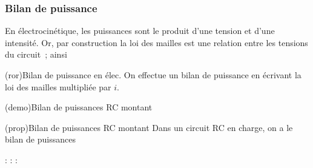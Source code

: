 \documentclass[../../main/main.tex]{subfiles}
\begin{document}
\subsubsection{Bilan de puissance}

En électrocinétique, les puissances sont le produit d'une tension et d'une
intensité. Or, par construction la loi des mailles est une relation entre les
tensions du circuit~; ainsi

\begin{tcb*}[fontupper=\Large, bld, cnt](ror){Bilan de puissance en élec.}
	On effectue un bilan de puissance en écrivant la loi des mailles multipliée
	par $i$.
\end{tcb*}
\begin{tcb*}[label=demo:rcpuiss-charge](demo){Bilan de puissances RC montant}
	\vspace{-15pt}
	\vspace{-15pt}
\end{tcb*}
\begin{tcb*}[label=prop:rcpuiss-charge](prop){Bilan de puissances RC montant}
	Dans un circuit RC en charge, on a le bilan de puissances
	\psw{%
		\[
			\boxed{\Pc_G = \Pc_C + \Pc_J}
		\]
	}%
	\vspace{-15pt}
	\begin{itemize}[leftmargin=50pt]
		\olditem[$\Pc_G = Ei$] : %
		\olditem[$\Pc_C = \dv{\Ec_C}{t}$] : %
		\olditem[$\Pc_J = Ri^{2}$] : %
	\end{itemize}
\end{tcb*}
\end{document}
